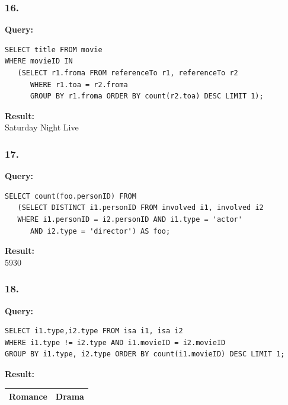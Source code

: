 \documentclass[10pt,a4paper,final]{report}
\begin{document}
\subsubsection*{16.}
\textbf{Query:}
\begin{lstlisting}
SELECT title FROM movie 
WHERE movieID IN 
   (SELECT r1.froma FROM referenceTo r1, referenceTo r2
      WHERE r1.toa = r2.froma 
      GROUP BY r1.froma ORDER BY count(r2.toa) DESC LIMIT 1);
\end{lstlisting}
\textbf{Result:}\\
Saturday Night Live
\subsubsection*{17.}
\textbf{Query:}
\begin{lstlisting}
SELECT count(foo.personID) FROM 
   (SELECT DISTINCT i1.personID FROM involved i1, involved i2 
   WHERE i1.personID = i2.personID AND i1.type = 'actor' 
      AND i2.type = 'director') AS foo;
\end{lstlisting}
\textbf{Result:}\\
5930
\subsubsection*{18.}
\textbf{Query:}
\begin{lstlisting}
SELECT i1.type,i2.type FROM isa i1, isa i2 
WHERE i1.type != i2.type AND i1.movieID = i2.movieID 
GROUP BY i1.type, i2.type ORDER BY count(i1.movieID) DESC LIMIT 1;
\end{lstlisting}
\textbf{Result:}

\begin{tabular}{|c|c|}
\hline 
Romance & Drama \\ 
\hline 
\end{tabular} 
\end{document}
